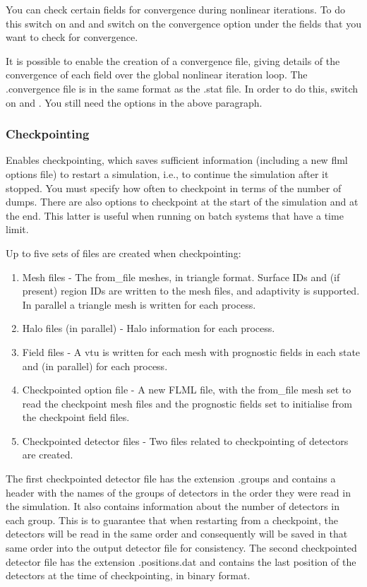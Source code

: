 You can check certain fields for convergence during nonlinear iterations.  To do this switch on  and  and switch on the convergence option under the fields that you want to check for convergence. 

It is possible to enable the creation of a convergence file, giving details of the convergence of each field over the global nonlinear iteration loop. The .convergence file is in the same format as the .stat file. In order to do this, switch on 
  and .  You still need the options in the above paragraph.

\subsubsection{Checkpointing}
\label{sec:configuring_fluidity_checkpointing}
Enables checkpointing, which saves sufficient information (including a new flml options file) to restart a simulation, i.e., to continue the simulation after it stopped. You must specify how often to checkpoint in terms of the number of dumps. There
are also options to checkpoint at the start of the simulation and at the
end. This latter is useful when running on batch systems that have a time
limit.

Up to five sets of files are created when checkpointing:
\begin{enumerate}
\item Mesh files - The from\_file meshes, in triangle format. Surface IDs
  and (if present) region IDs are written to the mesh files, and adaptivity
  is supported. In parallel a triangle mesh is written for each process.
\item Halo files (in parallel) - Halo information for each process.
\item Field files - A vtu is written for each mesh with prognostic fields in
  each state and (in parallel) for each process.
\item Checkpointed option file - A new FLML file, with the from\_file mesh
  set to read the checkpoint mesh files and the prognostic fields set
  to initialise from the checkpoint field files.
\item Checkpointed detector files - Two files related to checkpointing of
  detectors are created.
\end{enumerate}

The first checkpointed detector file has the extension .groups and contains
a header with the names of the groups of detectors in the order they were
read in the simulation. It also contains information about the number of
detectors in each group. This is to guarantee that when restarting from a
checkpoint, the detectors will be read in the same order and consequently
will be saved in that same order into the output detector file for
consistency.  The second checkpointed detector file has the extension
.positions.dat and contains the last position of the detectors at the time 
of checkpointing, in binary format.

